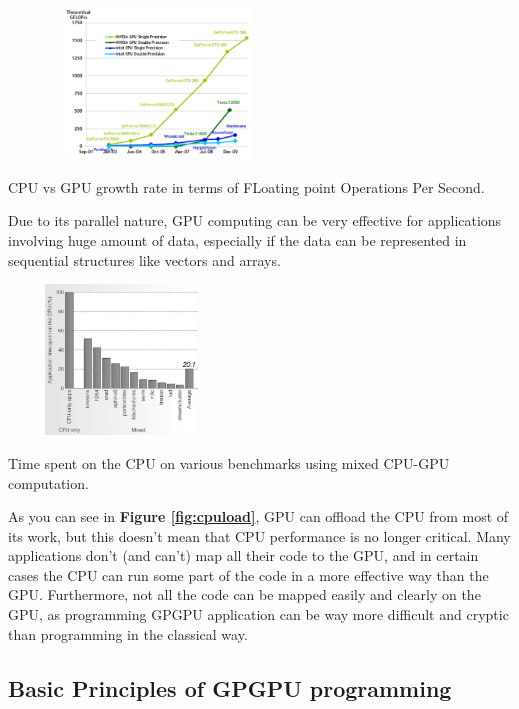 \begin{figurehere}
 \centering
 \includegraphics[width=8cm, height=4cm]{./eps/GPU_CPU_chart.eps}
 \caption{CPU vs GPU growth rate in terms of FLoating point Operations Per Second.}
 \label{fig:cpuvsgpu}
\end{figurehere}

Due to its parallel nature, GPU computing can be very effective for applications involving huge amount of data, especially if the data can be represented in sequential structures like vectors and arrays.

\begin{figurehere}
 \centering
 \includegraphics[width=6cm, height=4cm]{./eps/CPU_usage.eps}
 \caption{Time spent on the CPU on various benchmarks using mixed CPU-GPU computation. \cite{Arora:12:Redefining}}
 \label{fig:cpuload}
\end{figurehere}


As you can see in \textbf{Figure \ref{fig:cpuload}}, GPU can offload the CPU from most of its work, but this doesn't mean that CPU performance is no longer critical. Many applications don't (and can't) map all their code to the GPU, and in certain cases the CPU can run some part of the code in a more effective way than the GPU.
Furthermore, not all the code can be mapped easily and clearly on the GPU, as programming GPGPU application can be way more difficult and cryptic than programming in the classical way.

\subsection{Basic Principles of GPGPU programming} \label{sect:principles}

